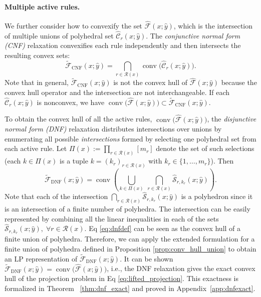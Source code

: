\documentclass{article}
\theoremstyle{plain}
\theoremstyle{definition}
\theoremstyle{remark}
\begin{document}
\paragraph{Multiple active rules.} We further consider how to convexify the set $ \widehat{\mathcal{F}}(x;\hat y) $, which is the intersection of multiple unions of polyhedral set   $\widehat{\mathcal{C}}_r(x;\hat y)$.
The \emph{conjunctive normal form (CNF)} relaxation convexifies each rule independently
and then intersects the resulting convex sets:
\begin{equation}
\widetilde{\mathcal{F}}_{\mathrm{CNF}}(x; \hat{y} )
=
\bigcap_{r\in\mathcal{R}(x)}
\operatorname{conv}\!\big(\widehat{\mathcal{C}}_r(x;\hat y)\big).
\end{equation}
Note that in general, $\widetilde{\mathcal{F}}_{\mathrm{CNF}}(x; \hat{y} )$ is not the convex hull of $\mathcal{\hat{F}}(x;\hat{y})$ because the convex hull operator and the intersection are not interchangeable. If each $\widehat{\mathcal{C}}_r(x;\hat y)$ is nonconvex, we have $\operatorname{conv}\!\big(\mathcal{\hat{F}}(x;\hat{y})\big)\subset\widetilde{\mathcal{F}}_{\mathrm{CNF}}(x; \hat{y})$.


To obtain the convex hull of all the active rules, $\operatorname{conv}\!\big(\mathcal{\hat{F}}(x;\hat{y})\big)$, the \emph{disjunctive normal form (DNF)} relaxation distributes intersections over unions by enumerating all
possible \emph{intersections} formed by selecting one polyhedral set from each active rule. Let
$\Pi(x):=\prod_{r\in\mathcal{R}(x)} [m_r]$ denote the set of such selections (each $k\in\Pi(x)$ is a tuple $k=(k_r)_{r\in\mathcal{R}(x)}$ with $k_r\in\{1,\dots,m_r\}$). Then
\begin{equation}\label{eq:dnfdef}
\widetilde{\mathcal{F}}_{\mathrm{DNF}}(x; \hat y)
=
\operatorname{conv}\!\left(
\bigcup_{k \in \Pi(x)}
\ \bigcap_{r\in\mathcal{R}(x)} \widehat{\mathcal{S}}_{r,k_r}(x;\hat y)
\right).
\end{equation}
Note that each of the intersection $\bigcap_{r\in\mathcal{R}(x)}\widehat{\mathcal{S}}_{r,k_r}(x;\hat y)$ is a polyhedron since it is an intersection of a finite number of polyhedra. The intersection can be easily represented by combining all the linear inequalities in each of the sets $\widehat{\mathcal{S}}_{r,k_r}(x;\hat y), \; \forall r \in \mathcal{R}(x)$.  Eq \eqref{eq:dnfdef} can be seen as the convex hull of a finite union of polyhedra. Therefore, we can apply the extended formulation for a finite union of polyhedra defined in Proposition \ref{prop:conv_hull_union} to obtain an LP representation of  $\widetilde{\mathcal{F}}_{\mathrm{DNF}}(x; \hat y)$. It can be shown $\widetilde{\mathcal{F}}_{\mathrm{DNF}}(x; \hat y)=\operatorname{conv}\!\big(\mathcal{\hat{F}}(x;\hat{y})\big)$, i.e., the DNF relaxation gives the exact convex hull of the projection problem in Eq \eqref{eq:lifted_projection}. This exactness is formalized in Theorem ~\ref{thm:dnf_exact} and proved in Appendix~\ref{app:dnfexact}.
\end{document}
